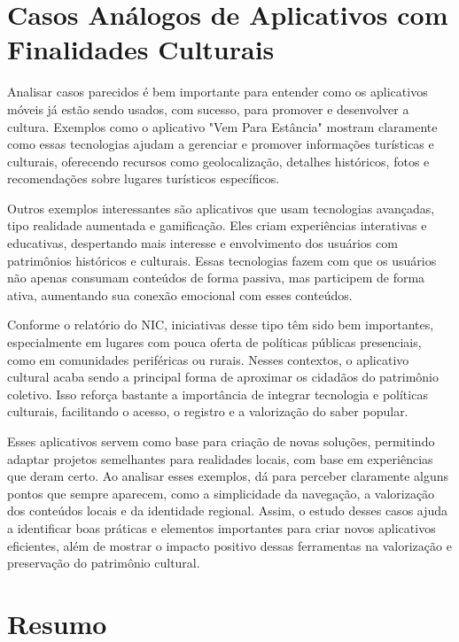 \section{Casos Análogos de Aplicativos com Finalidades Culturais} 

Analisar casos parecidos é bem importante para entender como os aplicativos móveis já estão sendo usados, com sucesso, para promover e desenvolver a cultura. Exemplos como o aplicativo "Vem Para Estância" mostram claramente como essas tecnologias ajudam a gerenciar e promover informações turísticas e culturais, oferecendo recursos como geolocalização, detalhes históricos, fotos e recomendações sobre lugares turísticos específicos.\cite{oliveira-cultura-tecnologias-ufse}

Outros exemplos interessantes são aplicativos que usam tecnologias avançadas, tipo realidade aumentada e gamificação. Eles criam experiências interativas e educativas, despertando mais interesse e envolvimento dos usuários com patrimônios históricos e culturais. Essas tecnologias fazem com que os usuários não apenas consumam conteúdos de forma passiva, mas participem de forma ativa, aumentando sua conexão emocional com esses conteúdos.\cite{soster2021tecnologias}

Conforme o relatório do NIC, iniciativas desse tipo têm sido bem importantes, especialmente em lugares com pouca oferta de políticas públicas presenciais, como em comunidades periféricas ou rurais. Nesses contextos, o aplicativo cultural acaba sendo a principal forma de aproximar os cidadãos do patrimônio coletivo. Isso reforça bastante a importância de integrar tecnologia e políticas culturais, facilitando o acesso, o registro e a valorização do saber popular.\cite{nic-cultura-tecnologias-no-brasil}

Esses aplicativos servem como base para criação de novas soluções, permitindo adaptar projetos semelhantes para realidades locais, com base em experiências que deram certo. Ao analisar esses exemplos, dá para perceber claramente alguns pontos que sempre aparecem, como a simplicidade da navegação, a valorização dos conteúdos locais e da identidade regional. Assim, o estudo desses casos ajuda a identificar boas práticas e elementos importantes para criar novos aplicativos eficientes, além de mostrar o impacto positivo dessas ferramentas na valorização e preservação do patrimônio cultural.


\section*{Resumo}

